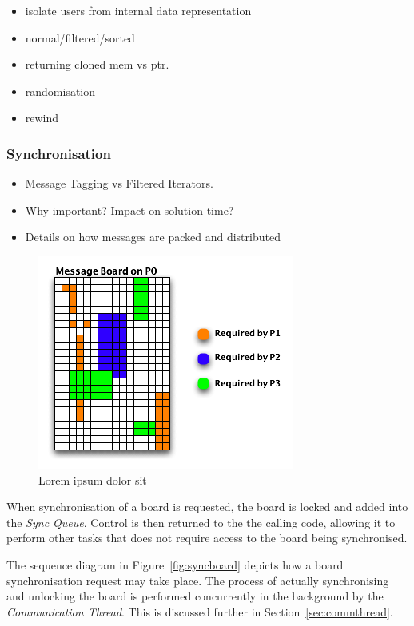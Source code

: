 \begin{itemize}
\item isolate users from internal data representation
\item normal/filtered/sorted
\item returning cloned mem vs ptr.
\item randomisation
\item rewind
\end{itemize} 

\subsubsection{Synchronisation}
\label{sec:mb_sync}

\begin{itemize}
\item Message Tagging vs Filtered Iterators.
\item Why important? Impact on solution time?
\item Details on how messages are packed and distributed
\end{itemize} 

\begin{figure}[h]
 \centering
  \includegraphics[scale=0.70]{taggedboard.png}
 \caption{Lorem ipsum dolor sit}
 \label{fig:taggedboard}
\end{figure}

When synchronisation of a board is requested, the board is locked and added into the \textit{Sync Queue}. Control is then returned to the the calling code, allowing it to perform other tasks that does not require access to the board being synchronised. 

The sequence diagram in  Figure~\ref{fig:syncboard} depicts how a board synchronisation request may take place. The process of actually synchronising and unlocking the board is performed concurrently in the background by the \textit{Communication Thread}. This is discussed further in Section~\ref{sec:commthread}.

